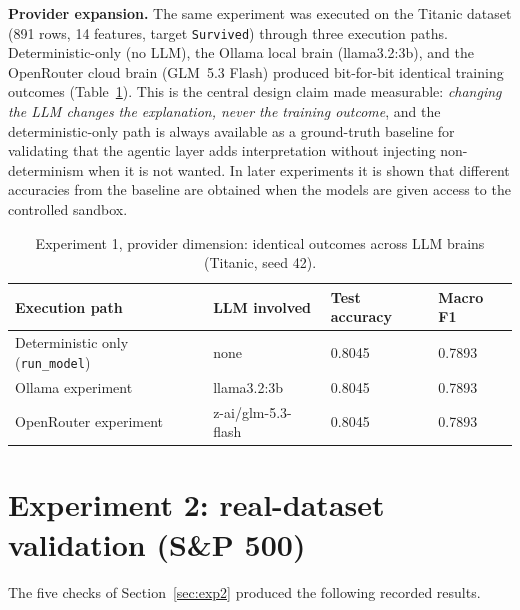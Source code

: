\textbf{Provider expansion.} The same experiment was executed on the Titanic dataset (891 rows, 14 features, target \texttt{Survived}) through three execution paths. Deterministic-only (no LLM), the Ollama local brain (llama3.2:3b), and the OpenRouter cloud brain (GLM~5.3 Flash) produced bit-for-bit identical training outcomes (Table~\ref{tab:providers}). This is the central design claim made measurable: \emph{changing the LLM changes the explanation, never the training outcome}, and the deterministic-only path is always available as a ground-truth baseline for validating that the agentic layer adds interpretation without injecting non-determinism when it is not wanted. In later experiments it is shown that different accuracies from the baseline are obtained when the models are given access to the controlled sandbox.

\begin{table}[H]
\centering
\caption{Experiment 1, provider dimension: identical outcomes across LLM brains (Titanic, seed 42).}
\label{tab:providers}
\small
\begin{tabular}{p{5.6cm}p{3.4cm}p{2.4cm}p{2.2cm}}
\toprule
\textbf{Execution path} & \textbf{LLM involved} & \textbf{Test accuracy} & \textbf{Macro F1} \\
\midrule
Deterministic only (\texttt{run\_model}) & none & 0.8045 & 0.7893 \\
Ollama experiment & llama3.2:3b & 0.8045 & 0.7893 \\
OpenRouter experiment & z-ai/glm-5.3-flash & 0.8045 & 0.7893 \\
\bottomrule
\end{tabular}
\end{table}


\section{Experiment 2: real-dataset validation (S\&P 500)}
\label{sec:exp2-results}

The five checks of Section~\ref{sec:exp2} produced the following recorded results.

